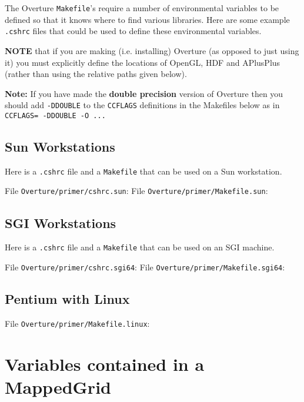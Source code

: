 \documentclass{article}
\begin{document}
The Overture {\tt Makefile}'s require a number of environmental variables to be 
defined so that it knows where
to find various libraries. 
Here are some example {\tt .cshrc} files that could be used to define these environmental
variables.

\noindent
{\bf NOTE} that if you are making (i.e. installing) Overture (as opposed to just using it) you must explicitly 
define the locations of OpenGL, HDF and APlusPlus (rather than using
the relative paths given below).

\noindent
{\bf Note:} If you have made the {\bf double precision} version of Overture then you should add {\tt -DDOUBLE}
to the {\tt CCFLAGS} definitions in the Makefiles below as in {\tt CCFLAGS= -DDOUBLE -O ...}

\subsection{Sun Workstations}

Here is a {\tt .cshrc} file and a {\tt Makefile} that can be used on a Sun workstation.

\noindent File {\tt Overture/primer/cshrc.sun}:
{\footnotesize
{}
}
\noindent  File {\tt Overture/primer/Makefile.sun}:
{\footnotesize
{}
}

\subsection{SGI Workstations}

Here is a {\tt .cshrc} file and a {\tt Makefile} that can be used on an SGI machine.

\noindent File {\tt Overture/primer/cshrc.sgi64}:
{\footnotesize
{}
}
\noindent File {\tt Overture/primer/Makefile.sgi64}:
{\footnotesize
{}
}


\subsection{Pentium with Linux}
\noindent  File {\tt Overture/primer/Makefile.linux}:


{\footnotesize
{}
}


\vfill\eject
\section{Variables contained in a MappedGrid}  \label{sec:MappedGrid}
\end{document}
